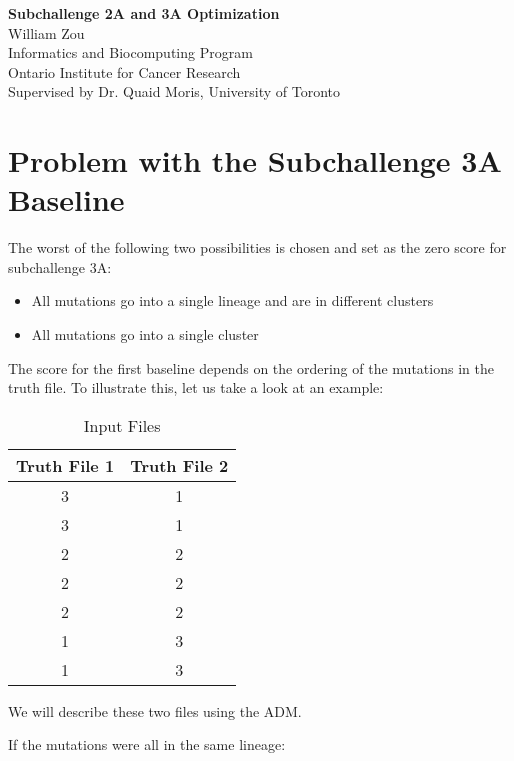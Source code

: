 \documentclass[a4paper, 11pt]{article}
\begin{document}
\noindent
\large\textbf{Subchallenge 2A and 3A Optimization} \\
\normalsize William Zou \\ 
Informatics and Biocomputing Program \\
Ontario Institute for Cancer Research \\
Supervised by Dr. Quaid Moris, University of Toronto \\

\justify
\section*{Problem with the Subchallenge 3A Baseline}
The worst of the following two possibilities is chosen and set as the zero score for subchallenge 3A:
\begin{itemize}
    \item All mutations go into a single lineage and are in different clusters
    \item All mutations go into a single cluster
\end{itemize} 

The score for the first baseline depends on the ordering of the mutations in the truth file. To illustrate this, let us take a look at an example:

\begin{center}
    \begin{table}[H]
    \centering
    \begin{tabular}{||c c||}
    \hline
    Truth File 1 & Truth File 2\\ 
    \hline\hline
    3 & 1\\
    \hline
    3 & 1\\
    \hline
    2 & 2\\
    \hline
    2 & 2\\
    \hline
    2 & 2\\
    \hline
    1 & 3\\
    \hline
    1 & 3\\
    \hline
    \end{tabular}
    \caption{Input Files}
    \label{table:files}
    \end{table}
\end{center}

We will describe these two files using the ADM.

If the mutations were all in the same lineage:
\end{document}
